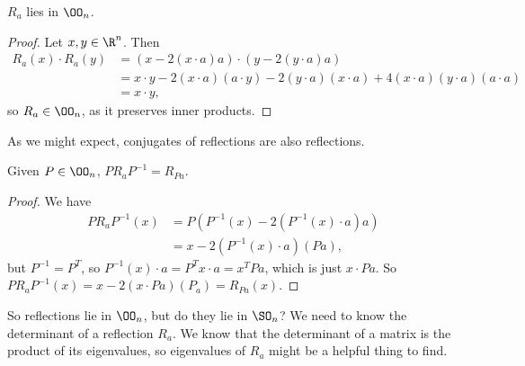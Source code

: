 \documentclass[a4paper]{scrartcl}
\begin{document}
\begin{definition}
\begin{center}

	\end{center}
\end{definition}

\begin{lemma}
	$R_a$ lies in $\OO_n$.
\end{lemma}
\begin{proof}
	Let $x, y \in \R^n$. Then
	\begin{align*}
		R_a(x) \cdot R_a(y) &= (x - 2(x \cdot a)a) \cdot (y - 2(y \cdot a)a) \\
		&= x \cdot y - 2(x \cdot a)(a \cdot y) - 2(y \cdot a)(x \cdot a) + 4(x \cdot a)(y \cdot a)(a \cdot a)\\
		&= x \cdot y,
	\end{align*}
	so $R_a \in \OO_n$, as it preserves inner products.
\end{proof}

As we might expect, conjugates of reflections are also reflections.

\begin{lemma}
	Given $P \in \OO_n$, $P R_a P^{-1} = R_{Pa}$.
\end{lemma}
\begin{proof}
	We have
	\begin{align*}
		P R_a P^{-1}(x) &= P(P^{-1}(x) - 2(P^{-1}(x) \cdot a)a) \\
		&= x - 2(P^{-1}(x) \cdot a)(P a),
	\end{align*}
	but $P^{-1} = P^T$, so $P^{-1}(x)\cdot a = P^T x \cdot a = x^T P a$, which is just $x \cdot Pa$. So $P R_a P^{-1}(x) = x - 2(x\cdot Pa)(P_a) = R_{Pa}(x)$.
\end{proof}


So reflections lie in $\OO_n$, but do they lie in $\SO_n$? We need to know the determinant of a reflection $R_a$. We know that the determinant of a matrix is the product of its eigenvalues, so eigenvalues of $R_a$ might be a helpful thing to find. 
\end{document}

